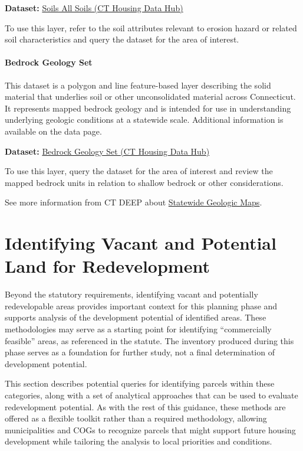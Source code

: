 \documentclass[
  letterpaper,
  DIV=11,
  numbers=noendperiod]{scrreprt}
\begin{document}
\textbf{Dataset:}
\href{https://housingmaps.ct.gov/datasets/CTDEEP::soils-all-soils/about}{Soils
All Soils (CT Housing Data Hub)}

To use this layer, refer to the soil attributes relevant to erosion
hazard or related soil characteristics and query the dataset for the
area of interest.

\subsubsection{Bedrock Geology Set}\label{sec-bedrock-geology-set}

This dataset is a polygon and line feature-based layer describing the
solid material that underlies soil or other unconsolidated material
across Connecticut. It represents mapped bedrock geology and is intended
for use in understanding underlying geologic conditions at a statewide
scale. Additional information is available on the data page.

\textbf{Dataset:}
\href{https://housingmaps.ct.gov/maps/a765e96b0c05413da1dcbea0ae86707d/about}{Bedrock
Geology Set (CT Housing Data Hub)}

To use this layer, query the dataset for the area of interest and review
the mapped bedrock units in relation to shallow bedrock or other
considerations.

See more information from CT DEEP about
\href{https://portal.ct.gov/DEEP/Geology/Statewide-Geologic-Maps}{Statewide
Geologic Maps}.


\chapter{Identifying Vacant and Potential Land for
Redevelopment}\label{identifying-vacant-and-potential-land-for-redevelopment}

Beyond the statutory requirements, identifying vacant and potentially
redevelopable areas provides important context for this planning phase
and supports analysis of the development potential of identified areas.
These methodologies may serve as a starting point for identifying
``commercially feasible'' areas, as referenced in the statute. The
inventory produced during this phase serves as a foundation for further
study, not a final determination of development potential.

This section describes potential queries for identifying parcels within
these categories, along with a set of analytical approaches that can be
used to evaluate redevelopment potential. As with the rest of this
guidance, these methods are offered as a flexible toolkit rather than a
required methodology, allowing municipalities and COGs to recognize
parcels that might support future housing development while tailoring
the analysis to local priorities and conditions.
\end{document}
